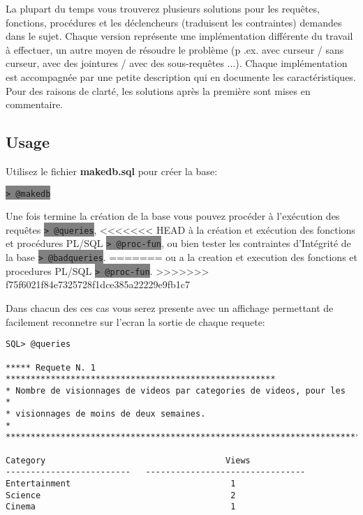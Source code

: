 \documentclass[twoside,openright,a4paper,11pt,french]{article}
\begin{document}
\bigbreak
La plupart du temps vous trouverez plusieurs solutions pour les requêtes,
fonctions, procédures et les déclencheurs (traduisent les contraintes) demandes
dans le sujet. Chaque version représente une implémentation différente du
travail à effectuer, un autre moyen de résoudre le problème (p .ex. avec
curseur / sans curseur, avec des jointures / avec des sous-requêtes ...).
Chaque implémentation est accompagnée par une petite description qui en
documente les caractéristiques. Pour des raisons de clarté, les solutions après
la première sont mises en commentaire.

\subsection{Usage}
Utilisez le fichier {\bf makedb.sql} pour créer la base:
\begin{center}
\colorbox{gray}{\lstinline[basicstyle=\ttfamily\color{black}]|> @makedb|}
\end{center}
Une fois termine la création de la base vous pouvez procéder à l'exécution des requêtes
\colorbox{gray}{\lstinline[basicstyle=\ttfamily\color{black}]|> @queries|},
<<<<<<< HEAD
à la création et exécution des fonctions et procédures PL/SQL
\colorbox{gray}{\lstinline[basicstyle=\ttfamily\color{black}]|> @proc-fun|},
ou bien tester les contraintes d'Intégrité de la base
\colorbox{gray}{\lstinline[basicstyle=\ttfamily\color{black}]|> @badqueries|}.
=======
ou a la creation et execution des fonctions et procedures PL/SQL
\colorbox{gray}{\lstinline[basicstyle=\ttfamily\color{black}]|> @proc-fun|}.
>>>>>>> f75f6021f84e7325728f1dce385a22229e9fb1c7

\smallbreak
Dans chacun des ces cas vous serez presente avec un affichage permettant de
facilement reconnetre sur l'ecran la sortie de chaque requete:

\begin{lstlisting}
SQL> @queries

***** Requete N. 1 ******************************************************
* Nombre de visionnages de videos par categories de videos, pour les            *
* visionnages de moins de deux semaines.                                        *
*************************************************************************

Category                                    Views
-------------------------   --------------------------------
Entertainment                                1
Science                                      2
Cinema                                       1
\end{lstlisting}
\end{document}
